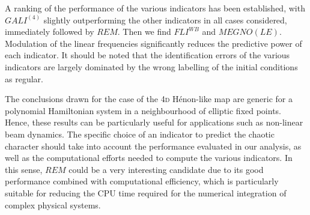 A ranking of the performance of the various indicators has been established, with $GALI^{(4)}$ slightly outperforming the other indicators in all cases considered, immediately followed by $REM$. Then we find $FLI^{{WB}}$ and $MEGNO(LE)$. Modulation of the linear frequencies significantly reduces the predictive power of each indicator. It should be noted that the identification errors of the various indicators are largely dominated by the wrong labelling of the initial conditions as regular. 

The conclusions drawn for the case of the 4\textsc{d} H\'enon-like map are generic for a polynomial Hamiltonian system in a neighbourhood of elliptic fixed points. Hence, these results can be particularly useful for applications such as non-linear beam dynamics. The specific choice of an indicator to predict the chaotic character should take into account the performance evaluated in our analysis, as well as the computational efforts needed to compute the various indicators. In this sense, $REM$ could be a very interesting candidate due to its good performance combined with computational efficiency, which is particularly suitable for reducing the CPU time required for the numerical integration of complex physical systems.
%
